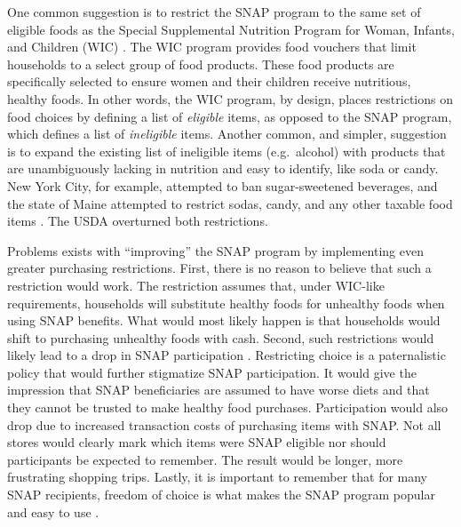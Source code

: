 \documentclass[12pt,letterpaperpaper,]{book}
\begin{document}
One common suggestion is to restrict the SNAP program to the same set of
eligible foods as the Special Supplemental Nutrition Program for Woman,
Infants, and Children (WIC) \citep{dinour_food_2007}. The WIC program
provides food vouchers that limit households to a select group of food
products. These food products are specifically selected to ensure women
and their children receive nutritious, healthy foods. In other words,
the WIC program, by design, places restrictions on food choices by
defining a list of \emph{eligible} items, as opposed to the SNAP
program, which defines a list of \emph{ineligible} items. Another
common, and simpler, suggestion is to expand the existing list of
ineligible items (e.g.~alcohol) with products that are unambiguously
lacking in nutrition and easy to identify, like soda or candy. New York
City, for example, attempted to ban sugar-sweetened beverages, and the
state of Maine attempted to restrict sodas, candy, and any other taxable
food items \citep{gundersen_snap_2015}. The USDA overturned both
restrictions.

Problems exists with ``improving'' the SNAP program by implementing even
greater purchasing restrictions. First, there is no reason to believe
that such a restriction would work. The restriction assumes that, under
WIC-like requirements, households will substitute healthy foods for
unhealthy foods when using SNAP benefits. What would most likely happen
is that households would shift to purchasing unhealthy foods with cash.
Second, such restrictions would likely lead to a drop in SNAP
participation \citep{gundersen_snap_2015}. Restricting choice is a
paternalistic policy that would further stigmatize SNAP participation.
It would give the impression that SNAP beneficiaries are assumed to have
worse diets and that they cannot be trusted to make healthy food
purchases. Participation would also drop due to increased transaction
costs of purchasing items with SNAP. Not all stores would clearly mark
which items were SNAP eligible nor should participants be expected to
remember. The result would be longer, more frustrating shopping trips.
Lastly, it is important to remember that for many SNAP recipients,
freedom of choice is what makes the SNAP program popular and easy to use
\citep{edin_snap_2013}.
\end{document}
